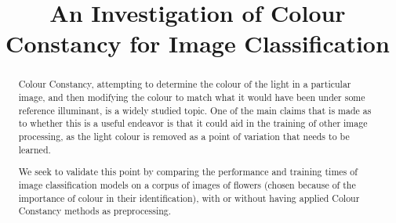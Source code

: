 \documentclass{bmvc2k}
\title{An Investigation of Colour Constancy for Image Classification}
\begin{document}
\maketitle

\begin{abstract}
Colour Constancy, attempting to determine the colour of the light in a particular image, and then 
modifying the colour to match what it would have been under some reference illuminant, is a widely studied topic.
One of the main claims that is made as to whether this is a useful endeavor is that it could aid in the training
of other image processing, as the light colour is removed as a point of variation that needs to be learned.

We seek to validate this point by comparing the performance and training times of image classification models on 
a corpus of images of flowers (chosen because of the importance of colour in their identification), with or without
having applied Colour Constancy methods as preprocessing.
\end{abstract}






\end{document}
